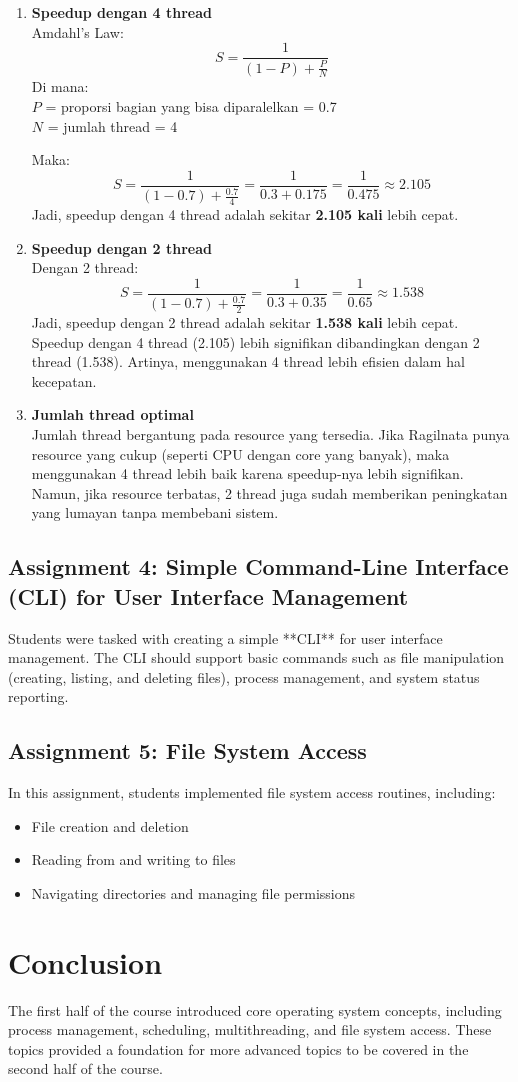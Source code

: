 \documentclass[12pt]{article}
\begin{document}
\begin{enumerate}
    \item \textbf{Speedup dengan 4 thread} \\
    Amdahl's Law:
    \[
    S = \frac{1}{(1 - P) + \frac{P}{N}}
    \]
    Di mana: \\
    $P$ = proporsi bagian yang bisa diparalelkan = 0.7 \\
    $N$ = jumlah thread = 4

    Maka:
    \[
    S = \frac{1}{(1 - 0.7) + \frac{0.7}{4}} = \frac{1}{0.3 + 0.175} = \frac{1}{0.475} \approx 2.105
    \]
    Jadi, speedup dengan 4 thread adalah sekitar \textbf{2.105 kali} lebih cepat.
    
    \item \textbf{Speedup dengan 2 thread} \\
    Dengan 2 thread:
    \[
    S = \frac{1}{(1 - 0.7) + \frac{0.7}{2}} = \frac{1}{0.3 + 0.35} = \frac{1}{0.65} \approx 1.538
    \]
    Jadi, speedup dengan 2 thread adalah sekitar \textbf{1.538 kali} lebih cepat. \\
    Speedup dengan 4 thread (2.105) lebih signifikan dibandingkan dengan 2 thread (1.538). Artinya, menggunakan 4 thread lebih efisien dalam hal kecepatan.
    
    \item \textbf{Jumlah thread optimal} \\
    Jumlah thread bergantung pada resource yang tersedia. Jika Ragilnata punya resource yang cukup (seperti CPU dengan core yang banyak), maka menggunakan 4 thread lebih baik karena speedup-nya lebih signifikan. Namun, jika resource terbatas, 2 thread juga sudah memberikan peningkatan yang lumayan tanpa membebani sistem.
\end{enumerate}

\subsection{Assignment 4: Simple Command-Line Interface (CLI) for User Interface Management}
Students were tasked with creating a simple **CLI** for user interface management. The CLI should support basic commands such as file manipulation (creating, listing, and deleting files), process management, and system status reporting.

\subsection{Assignment 5: File System Access}
In this assignment, students implemented file system access routines, including:
\begin{itemize}
    \item File creation and deletion
    \item Reading from and writing to files
    \item Navigating directories and managing file permissions
\end{itemize}

\section{Conclusion}
The first half of the course introduced core operating system concepts, including process management, scheduling, multithreading, and file system access. These topics provided a foundation for more advanced topics to be covered in the second half of the course.
\end{document}
